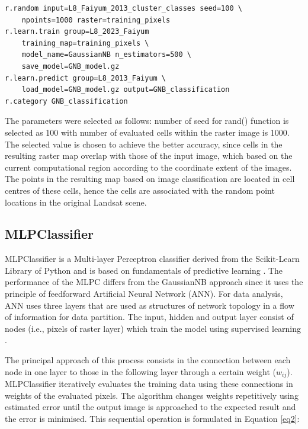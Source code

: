 \documentclass[final,5p,times,twocolumn]{elsarticle}
\numberwithin{table}{section}
\begin{document}
\begin{footnotesize}
\begin{verbatim}
r.random input=L8_Faiyum_2013_cluster_classes seed=100 \
    npoints=1000 raster=training_pixels
r.learn.train group=L8_2023_Faiyum 
    training_map=training_pixels \
    model_name=GaussianNB n_estimators=500 \
    save_model=GNB_model.gz
r.learn.predict group=L8_2013_Faiyum \
    load_model=GNB_model.gz output=GNB_classification
r.category GNB_classification
\end{verbatim}
\end{footnotesize}

The parameters were selected as follows: number of seed for rand() function is selected as 100 with number of evaluated cells within the raster image is 1000. The selected value is chosen to achieve the better accuracy, since cells in the resulting raster map overlap with those of the input image, which based on the current computational region according to the coordinate extent of the images. The points in the resulting map based on image classification are located in cell centres of these cells, hence the cells are associated with the random point locations in the original Landsat scene.

\subsection{MLPClassifier}

MLPClassifier is a Multi-layer Perceptron classifier derived from the Scikit-Learn Library of Python and is based on fundamentals of predictive learning \cite{Rosenblatt}. The performance of the MLPC differs from the GaussianNB approach since it uses the principle of feedforward Artificial Neural Network (ANN). For data analysis, ANN uses three layers that are used as structures of network topology in a flow of information for data partition. The input, hidden and output layer consist of nodes (i.e., pixels of raster layer) which train the model using supervised learning \cite{ALDOUSARI2023381,9034557}. 

The principal approach of this process consists in the connection between each node in one layer to those in the following layer through a certain weight ($w_{ij}$). MLPClassifier iteratively evaluates the training data using these connections in weights of the evaluated pixels. The algorithm changes weights repetitively using estimated error until the output image is approached to the expected result and the error is minimised. This sequential operation is formulated in Equation \ref{eq2}: 
\end{document}
